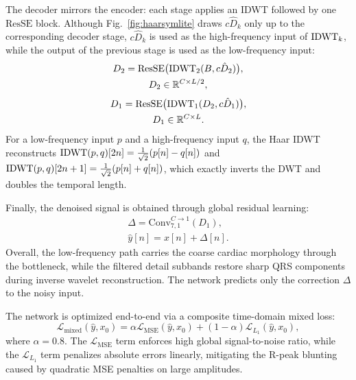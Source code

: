 The decoder mirrors the encoder: each stage applies an IDWT followed by one $\mathrm{ResSE}$ block. Although Fig.~\ref{fig:haarsymlite} draws $c\hat{D}_k$ only up to the corresponding decoder stage, $c\hat{D}_k$ is used as the high-frequency input of $\mathrm{IDWT}_k$, while the output of the previous stage is used as the low-frequency input:
\begin{equation}
\begin{gathered}
D_2 = \mathrm{ResSE}\big(\mathrm{IDWT}_2(B, c\hat{D}_2)\big), \\
D_2 \in \mathbb{R}^{C \times L/2},
\end{gathered}
\end{equation}
\begin{equation}
\begin{gathered}
D_1 = \mathrm{ResSE}\big(\mathrm{IDWT}_1(D_2, c\hat{D}_1)\big), \\
D_1 \in \mathbb{R}^{C \times L}.
\end{gathered}
\end{equation}
For a low-frequency input $p$ and a high-frequency input $q$, the Haar IDWT reconstructs $\mathrm{IDWT}(p, q)[2n] = \frac{1}{\sqrt{2}}(p[n] - q[n])$ and $\mathrm{IDWT}(p, q)[2n+1] = \frac{1}{\sqrt{2}}(p[n] + q[n])$, which exactly inverts the DWT and doubles the temporal length.

Finally, the denoised signal is obtained through global residual learning:
\begin{equation}
\begin{gathered}
\Delta = \mathrm{Conv}_{7,1}^{C \to 1}(D_1), \\
\hat{y}[n] = x[n] + \Delta[n].
\end{gathered}
\end{equation}
Overall, the low-frequency path carries the coarse cardiac morphology through the bottleneck, while the filtered detail subbands restore sharp QRS components during inverse wavelet reconstruction. The network predicts only the correction $\Delta$ to the noisy input.

The network is optimized end-to-end via a composite time-domain mixed loss:
\begin{equation}
\mathcal{L}_{\mathrm{mixed}}(\hat{y}, x_0) = \alpha \mathcal{L}_{\mathrm{MSE}}(\hat{y}, x_0) + (1-\alpha) \mathcal{L}_{L_1}(\hat{y}, x_0),
\label{eq:mixed_loss}
\end{equation}
where $\alpha = 0.8$. The $\mathcal{L}_{\mathrm{MSE}}$ term enforces high global signal-to-noise ratio, while the $\mathcal{L}_{L_1}$ term penalizes absolute errors linearly, mitigating the R-peak blunting caused by quadratic MSE penalties on large amplitudes.

